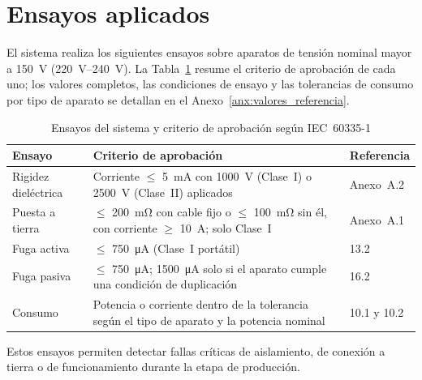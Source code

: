 \section{Ensayos aplicados}
\label{sec:ensayos}

El sistema realiza los siguientes ensayos sobre aparatos de tensión nominal
mayor a \SI{150}{\volt} (\SIrange{220}{240}{\volt}). La Tabla~\ref{tab:ensayos}
resume el criterio de aprobación de cada uno; los valores completos, las
condiciones de ensayo y las tolerancias de consumo por tipo de aparato se
detallan en el Anexo~\ref{anx:valores_referencia}.

\begin{table}[htbp]
\centering
\caption{Ensayos del sistema y criterio de aprobación según IEC~60335-1}
\label{tab:ensayos}
\renewcommand{\arraystretch}{1.3}
\begin{tabularx}{\linewidth}{@{} l X l @{}}
\toprule
\textbf{Ensayo} & \textbf{Criterio de aprobación} & \textbf{Referencia} \\
\midrule
Rigidez dieléctrica
  & Corriente $\leq$ \SI{5}{\milli\ampere} con \SI{1000}{\volt} (Clase~I) o
    \SI{2500}{\volt} (Clase~II) aplicados
  & Anexo~A.2 \\
Puesta a tierra
  & $\leq$ \SI{200}{\milli\ohm} con cable fijo o $\leq$ \SI{100}{\milli\ohm} sin
    él, con corriente $\geq$ \SI{10}{\ampere}; solo Clase~I
  & Anexo~A.1 \\
Fuga activa
  & $\leq$ \SI{750}{\micro\ampere} (Clase~I portátil)
  & 13.2 \\
Fuga pasiva
  & $\leq$ \SI{750}{\micro\ampere}; \SI{1500}{\micro\ampere} solo si el aparato
    cumple una condición de duplicación
  & 16.2 \\
Consumo
  & Potencia o corriente dentro de la tolerancia según el tipo de aparato y la
    potencia nominal
  & 10.1 y 10.2 \\
\bottomrule
\end{tabularx}
\end{table}

Estos ensayos permiten detectar fallas críticas de aislamiento, de conexión a
tierra o de funcionamiento durante la etapa de producción.
